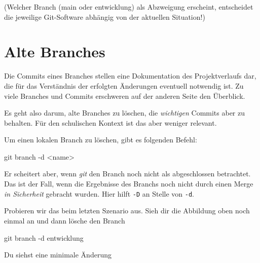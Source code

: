 \documentclass[
  ngerman,
  letterpaper,
  DIV=11]{scrreprt}
\newenvironment{Shaded}{\begin{snugshade}}{\end{snugshade}}
\newcommand{\AttributeTok}[1]{\textcolor[rgb]{0.40,0.45,0.13}{#1}}
\newcommand{\FunctionTok}[1]{\textcolor[rgb]{0.28,0.35,0.67}{#1}}
\newcommand{\NormalTok}[1]{\textcolor[rgb]{0.00,0.23,0.31}{#1}}
\newcommand{\OperatorTok}[1]{\textcolor[rgb]{0.37,0.37,0.37}{#1}}
\newcommand{\git}{\textit{git}\xspace}
\begin{document}
(Welcher Branch (main oder entwicklung) als Abzweigung erscheint,
entscheidet die jeweilige Git-Software abhängig von der aktuellen
Situation!)

\section{Alte Branches}\label{alte-branches}

Die Commits eines Branches stellen eine Dokumentation des
Projektverlaufs dar, die für das Verständnis der erfolgten Änderungen
eventuell notwendig ist. Zu viele Branches und Commits erschweren auf
der anderen Seite den Überblick.

Es geht also darum, alte Branches zu löschen, die \emph{wichtigen}
Commits aber zu behalten. Für den schulischen Kontext ist das aber
weniger relevant.

Um einen lokalen Branch zu löschen, gibt es folgenden Befehl:

\begin{Shaded}
\begin{Highlighting}[]
\FunctionTok{git}\NormalTok{ branch }\AttributeTok{{-}d} \OperatorTok{\textless{}}\NormalTok{name}\OperatorTok{\textgreater{}}
\end{Highlighting}
\end{Shaded}

Er scheitert aber, wenn \git den Branch noch nicht als abgeschlossen
betrachtet. Das ist der Fall, wenn die Ergebnisse des Branchs noch nicht
durch einen Merge \emph{in Sicherheit} gebracht wurden. Hier hilft
\texttt{-D} an Stelle von \texttt{-d}.

Probieren wir das beim letzten Szenario aus. Sieh dir die Abbildung oben
noch einmal an und dann lösche den Branch

\begin{Shaded}
\begin{Highlighting}[]
\FunctionTok{git}\NormalTok{ branch }\AttributeTok{{-}d}\NormalTok{ entwicklung }
\end{Highlighting}
\end{Shaded}

Du siehst eine minimale Änderung
\end{document}
